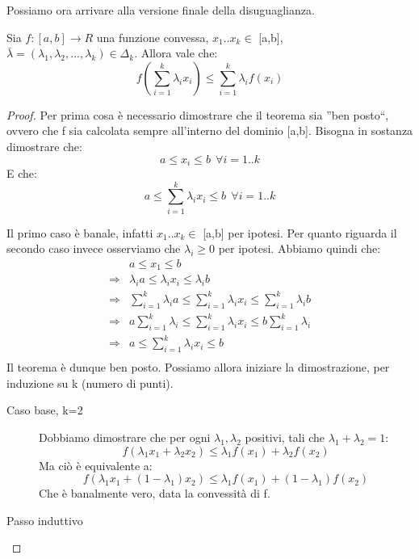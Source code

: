 Possiamo ora arrivare alla versione finale della disuguaglianza.

\bigskip

\begin{teorema}
 Sia $f: [a,b] \to R$ una funzione convessa, $x_1..x_k \in$ [a,b], $\bar{\lambda}=(\lambda_1,\lambda_2,...,\lambda_k) \in \Delta_k$.
 Allora vale che:
 \[
 f \left( \sum_{i=1}^k \lambda_i x_i \right) \le \sum_{i=1}^k \lambda_i f(x_i)
 \]
\begin{proof}
 Per prima cosa è necessario dimostrare che il teorema sia ''ben posto``, ovvero che f sia calcolata sempre 
 all'interno del dominio [a,b].
 Bisogna in sostanza dimostrare che:
 \[
  a \le x_i \le b  \ \ \forall i=1..k
 \]
 E che:
 \[
  a \le \sum_{i=1}^k \lambda_i x_i \le b \ \ \forall i=1..k
 \]

 \noindent
 Il primo caso è banale, infatti $x_1..x_k \in$ [a,b] per ipotesi.
 Per quanto riguarda il secondo caso invece osserviamo che $\lambda_i \ge0$ per ipotesi.
 Abbiamo quindi che:
 \[\begin{split}
  & a \le x_1 \le b \\
  \Rightarrow & \lambda_i a \le \lambda_i x_i \le \lambda_i b \\
  \Rightarrow & \sum_{i=1}^k \lambda_i a \le \sum_{i=1}^k \lambda_i x_i \le \sum_{i=1}^k \lambda_i b \\
  \Rightarrow & a \sum_{i=1}^k \lambda_i \le \sum_{i=1}^k \lambda_i x_i \le b \sum_{i=1}^k \lambda_i \\
  \Rightarrow & a \le \sum_{i=1}^k \lambda_i x_i \le b \\
   \end{split}
 \]
Il teorema è dunque ben posto. Possiamo allora iniziare la dimostrazione, per induzione su k (numero di punti).

\begin{description}
 \item[Caso base, k=2]
  \mbox{}

  Dobbiamo dimostrare che per ogni $\lambda_1,\lambda_2$ positivi, tali che $\lambda_1+\lambda_2=1$:
  \[
   f( \lambda_1 x_1 + \lambda_2 x_2) \le \lambda_1 f(x_1) + \lambda_2 f(x_2)
  \]
  Ma ciò è equivalente a:
  \[
   f( \lambda_1 x_1 + (1-\lambda_1) x_2) \le \lambda_1 f(x_1) + (1-\lambda_1) f(x_2)
  \]
  Che è banalmente vero, data la convessità di f.

 \item[Passo induttivo]
\mbox{}


\end{description}
\end{proof}
\end{teorema}
